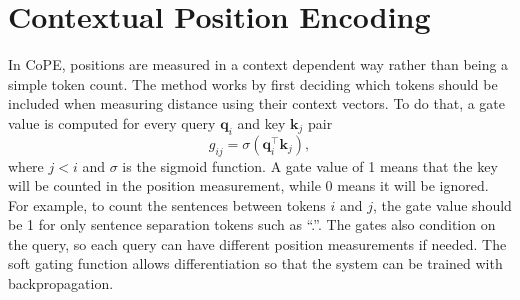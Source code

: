 \documentclass{article}
\newcommand{\oursfull}{Contextual Position Encoding}
\newcommand{\ours}{CoPE\xspace}
\renewcommand{\vec}{\mathbf}
\begin{document}


\section{\oursfull{}}
\label{sec:encoding}
In \ours{}, positions are measured in a context dependent way rather than being a simple token count. 
The method works by first deciding
which tokens should be included when measuring distance using their context vectors.
To do that,  a gate value is computed for every query $\vec{q}_i$ and key $\vec{k}_j$ pair 
\begin{equation}\label{eq:gates}
g_{ij} = \sigma(\vec{q}_i^\top \vec{k}_j),
\end{equation}
where $j < i$ and $\sigma$ is the sigmoid function.
A gate value of 1 means that the key will be counted in the position measurement, while 0 means it will be ignored.
For example, to count the sentences between tokens $i$ and $j$, the gate value should be 1 for only sentence separation tokens such as ``.''. 
The gates also condition on the query, so each query can have different position measurements if needed.
The soft gating function allows differentiation so that the system can be trained with backpropagation.
\end{document}
